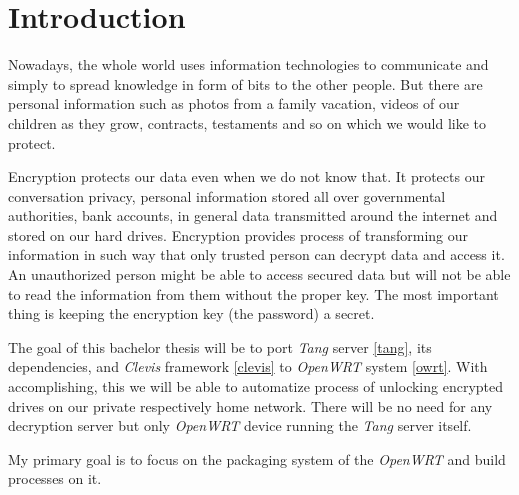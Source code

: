\documentclass[../xdudla00-porting-Tang-to-Open-WRT.tex]{subfiles}
\begin{document}

\chapter{Introduction}\label{introduction}

Nowadays, the whole world uses information technologies to communicate and simply to spread knowledge in form of bits to the other people.  But there are personal information such as photos from a family vacation, videos of our children as they grow, contracts, testaments and so on which we would like to protect.

Encryption protects our data even when we do not know that. It protects our conversation privacy, personal information stored all over governmental authorities, bank accounts, in general data transmitted around the internet and stored on our hard drives. Encryption provides process of transforming our information in such way that only trusted person can decrypt data and access it. An unauthorized person might be able to access secured data but will not be able to read the information from them without the proper key. The most important thing is keeping the encryption key (the password) a secret.

The goal of this bachelor thesis will be to port %
{\it Tang} server \ref{tang}, its dependencies, and {\it Clevis} framework \ref{clevis} to {\it OpenWRT} system \ref{owrt}. With accomplishing, this we will be able to automatize process of unlocking encrypted drives on our private respectively home network. There will be no need for any decryption server but only {\it OpenWRT} device running the {\it Tang} server itself.

My primary goal is to focus on the packaging system of the {\it OpenWRT} and build processes on it.

\end{document}
